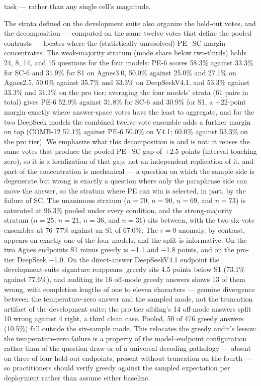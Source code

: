 task --- rather than any single cell's magnitude.

The strata defined on the development suite also organize the held-out votes, and the decomposition --- computed on the same twelve votes that define the pooled contrasts --- locates where the (statistically unresolved) PE$-$SC margin concentrates. The weak-majority stratum (mode share below two-thirds) holds 24, 8, 14, and 15 questions for the four models: PE-6 scores 58.3\% against 33.3\% for SC-6 and 31.9\% for S1 on Agnes3.0, 50.0\% against 25.0\% and 27.1\% on Agnes2.5, 50.0\% against 35.7\% and 33.3\% on DeepSeekV4.1, and 53.3\% against 33.3\% and 31.1\% on the pro tier; averaging the four models' strata (61 pairs in total) gives PE-6 52.9\% against 31.8\% for SC-6 and 30.9\% for S1, a $+$22-point margin exactly where answer-space votes have the least to aggregate, and for the two DeepSeek models the combined twelve-vote ensemble adds a further margin on top (COMB-12 57.1\% against PE-6 50.0\% on V4.1; 60.0\% against 53.3\% on the pro tier). We emphasize what this decomposition is and is not: it reuses the same votes that produce the pooled PE$-$SC gap of $+2.5$ points (interval touching zero), so it is a localization of that gap, not an independent replication of it, and part of the concentration is mechanical --- a question on which the sample side is degenerate but wrong is exactly a question where only the paraphrase side can move the answer, so the stratum where PE can win is selected, in part, by the failure of SC. The unanimous stratum ($n=70$, $n=90$, $n=69$, and $n=73$) is saturated at 96.3\% pooled under every condition, and the strong-majority stratum ($n=25$, $n=21$, $n=36$, and $n=31$) sits between, with the two six-vote ensembles at 76--77\% against an S1 of 67.0\%. The $\tau=0$ anomaly, by contrast, appears on exactly one of the four models, and the split is informative. On the two Agnes endpoints S1 minus greedy is $-$1.1 and $-$1.8 points, and on the pro-tier DeepSeek $-$1.0. On the direct-answer DeepSeekV4.1 endpoint the development-suite signature reappears: greedy sits 4.5 points below S1 (73.1\% against 77.6\%), and auditing its 16 off-mode greedy answers shows 13 of them wrong, with completion lengths of one to eleven characters --- genuine divergence between the temperature-zero answer and the sampled mode, not the truncation artifact of the development suite; the pro-tier sibling's 14 off-mode answers split 10 wrong against 4 right, a third clean case. Pooled, 50 of 476 greedy answers (10.5\%) fall outside the six-sample mode. This relocates the greedy audit's lesson: the temperature-zero failure is a property of the model--endpoint configuration rather than of the question draw or of a universal decoding pathology --- absent on three of four held-out endpoints, present without truncation on the fourth --- so practitioners should verify greedy against the sampled expectation per deployment rather than assume either baseline.

